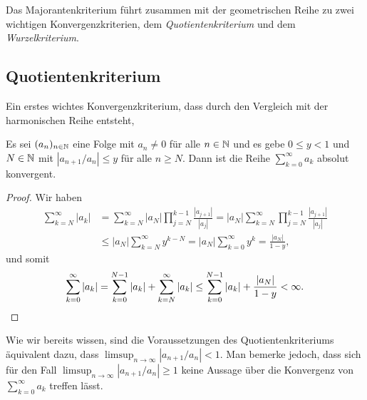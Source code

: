 \documentclass[a4paper,10pt]{article}
\begin{document}
Das Majorantenkriterium führt zusammen mit der geometrischen Reihe zu zwei wichtigen Konvergenzkriterien, dem \emph{Quotientenkriterium} und dem \emph{Wurzelkriterium}.





\subsection{Quotientenkriterium}
Ein erstes wichtes Konvergenzkriterium, dass durch den Vergleich mit der harmonischen Reihe entsteht, 


\begin{prop}
 Es sei $(a_n)_{n \in \mathbb{N}}$ eine Folge mit $a_n \neq 0$ für alle $n \in \mathbb{N}$ und es gebe $0 \leq y < 1$ und $N \in \mathbb{N}$ mit $|a_{n+1}/a_n| \leq y$ für alle $n \geq N$. Dann ist die Reihe $\sum_{k=0}^\infty a_k$ absolut konvergent.
\end{prop}
\begin{proof}
 Wir haben
 \begin{align*}
  \sum_{k=N}^\infty |a_k|
  &= \sum_{k=N}^\infty |a_N| \prod_{j=N}^{k-1} \frac{|a_{j+1}|}{|a_j|}
  = |a_N| \sum_{k=N}^\infty \prod_{j=N}^{k-1} \frac{|a_{j+1}|}{|a_j|} \\
  &\leq |a_N| \sum_{k=N}^\infty y^{k-N}
  = |a_N| \sum_{k=0}^\infty y^k
  = \frac{|a_N|}{1-y},
 \end{align*}
 und somit
 \[
  \sum_{k=0}^\infty |a_k|
  = \sum_{k=0}^{N-1} |a_k| + \sum_{k=N}^\infty |a_k|
  \leq \sum_{k=0}^{N-1} |a_k| + \frac{|a_N|}{1-y}
  < \infty.
  \qedhere
 \]
\end{proof}


Wie wir bereits wissen, sind die Voraussetzungen des Quotientenkriteriums äquivalent dazu, dass $\limsup_{n \to \infty} |a_{n+1}/a_n| < 1$. Man bemerke jedoch, dass sich für den Fall $\limsup_{n \to \infty} |a_{n+1}/a_n| \geq 1$ keine Aussage über die Konvergenz von $\sum_{k=0}^\infty a_k$ treffen lässt.
\end{document}
